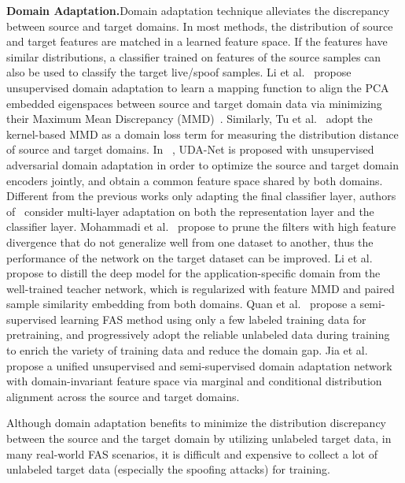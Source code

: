 \documentclass[10pt,journal,compsoc]{IEEEtran}
\begin{document}
\vspace{0.4em}
\noindent\textbf{Domain Adaptation.}\quad    Domain adaptation technique alleviates the discrepancy between source and target domains. In most methods, the distribution of source and target features are matched in a learned feature space. If the features have similar distributions, a classifier trained on features of the source samples can also be used to classify the target live/spoof samples. Li et al.~\cite{li2018unsupervised} propose unsupervised domain adaptation to learn a mapping function to align the PCA~\cite{wold1987principal} embedded eigenspaces between source and target domain data via minimizing their Maximum Mean Discrepancy (MMD)~\cite{gretton2012kernel}. Similarly, Tu et al.~\cite{tu2019deep} adopt the kernel-based MMD as a domain loss term for measuring the distribution distance of source and target domains. In ~\cite{wang2019improving,wang2020unsupervised}, UDA-Net is proposed with unsupervised adversarial domain adaptation in order to optimize the source and target domain encoders jointly, and obtain a common feature space shared by both domains. Different from the previous works only adapting the final classifier layer, authors of~\cite{zhou2019face} consider multi-layer adaptation on both the representation layer and the classifier layer. Mohammadi et al.~\cite{mohammadi2020domain} propose to prune the filters with high feature divergence that do not generalize well from one dataset to another, thus the performance of the network on the target dataset can be improved. Li et al.~\cite{li2020face2} propose to distill the deep model for the application-specific domain from the well-trained teacher network, which is regularized with feature MMD and paired sample similarity embedding from both domains. Quan et al.~\cite{quan2021progressive} propose a semi-supervised learning FAS method using only a few labeled training data for pretraining, and progressively adopt the reliable unlabeled data during training to enrich the variety of training data and reduce the domain gap. Jia et al.~\cite{jia2021unified} propose a unified unsupervised and semi-supervised domain adaptation network with domain-invariant feature space via marginal and conditional distribution alignment across the source and target domains.


Although domain adaptation benefits to minimize the distribution discrepancy between the source and the target domain by utilizing unlabeled target data, in many real-world FAS scenarios, it is difficult and expensive to collect a lot of unlabeled target data (especially the spoofing attacks) for training.
\end{document}
